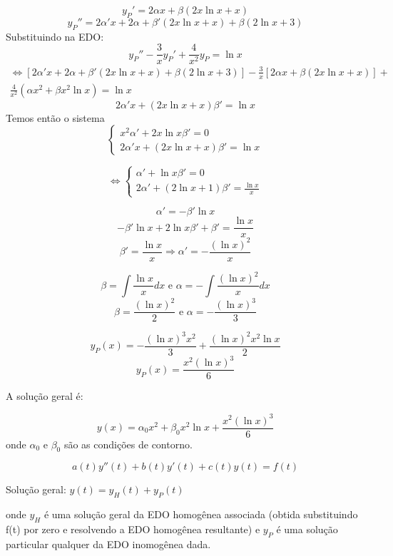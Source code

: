  \[ y_P '   =  2 \alpha x + \beta (2x \ln x + x) \]
 \[ y_P'' = 2 \alpha ' x + 2 \alpha + \beta ' (2x \ln x + x ) + \beta (2 \ln x + 3) \]
 Substituindo na EDO:
 \[ y_P '' - \frac{3}{x} y_P ' + \frac{4}{x^2} y_P = \ln x \]
 \begin{multline*}
   \Leftrightarrow \left[ 2 \alpha ' x + 2 \alpha  + \beta ' (2x \ln x + x) + \beta (2 \ln x + 3)
   \right] - \frac{3}{x} \left[ 2 \alpha x + \beta \left( 2x \ln x + x \right) \right]+
   \\ \frac{4}{x^2} \left( \alpha x^2 + \beta x^2 \ln x  \right) = \ln x \end{multline*}
 \[ 2 \alpha ' x + \left( 2x \ln x + x \right)\beta ' = \ln x \]
 Temos então o sistema
 $$\begin{cases}
     x^2 \alpha ' + 2 x \ln x \beta ' = 0 \\
     2 \alpha ' x + \left( 2x \ln x + x \right) \beta ' = \ln x  
   \end{cases}$$
   
   \[ \Leftrightarrow \begin{cases}
          \alpha ' + \ln x \beta ' = 0 \\ 2 \alpha ' + \left( 2 \ln x + 1\right) \beta ' = \frac{\ln x}{x}
        \end{cases} \]

      \[ \alpha ' = - \beta ' \ln x   \]
      \[ - \beta ' \ln x + 2\ln x \beta' + \beta ' = \frac{\ln x}{x} \]
      \[ \beta ' = \frac{\ln x }{x} \Rightarrow \alpha ' = - \frac{(\ln x)^2}{x} \]

      \[ \beta = \int \frac{\ln x}{x} dx \text{ e } \alpha = - \int \frac{(\ln x)^2}{x} dx \]
      \[ \beta = \frac{(\ln x)^2}{2} \text{ e } \alpha = - \frac{(\ln x )^3}{3} \]

      \[ y_P(x) = - \frac{(\ln x )^3 x^2}{3} + \frac{(\ln x)^2 x^2 \ln x}{2}\]
      \[ y_P(x) = \frac{x^2 (\ln x)^3}{6} \]

      A solução geral é:

      \[ y(x) =  \alpha _0 x^2 + \beta _0 x^2 \ln x + \frac{x^2 (\ln x)^3 }{6}\]
      onde \( \alpha_0 \)   e \( \beta_0 \) são as condições de contorno.

      

      \[ a(t) y''(t) + b(t) y'(t) + c(t) y(t) = f(t) \]
      
      Solução geral: \( y(t) = y_{H} (t) + y_{P} (t) \) 

      onde \( y_H \) é uma solução geral da EDO homogênea associada (obtida substituindo
      f(t) por zero e resolvendo a EDO homogênea resultante) e \( y_P \) é uma solução particular
      qualquer da EDO inomogênea dada.
      
